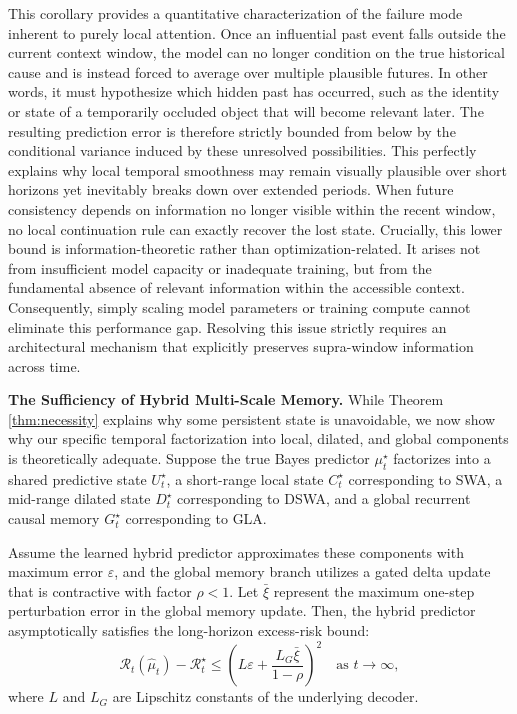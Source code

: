 \documentclass{llmxive}
\begin{document}
\begin{remark}
\normalfont This corollary provides a quantitative characterization of the failure mode inherent to purely local attention. Once an influential past event falls outside the current context window, the model can no longer condition on the true historical cause and is instead forced to average over multiple plausible futures. In other words, it must hypothesize which hidden past has occurred, such as the identity or state of a temporarily occluded object that will become relevant later. The resulting prediction error is therefore strictly bounded from below by the conditional variance induced by these unresolved possibilities. This perfectly explains why local temporal smoothness may remain visually plausible over short horizons yet inevitably breaks down over extended periods. When future consistency depends on information no longer visible within the recent window, no local continuation rule can exactly recover the lost state. Crucially, this lower bound is information-theoretic rather than optimization-related. It arises not from insufficient model capacity or inadequate training, but from the fundamental absence of relevant information within the accessible context. Consequently, simply scaling model parameters or training compute cannot eliminate this performance gap. Resolving this issue strictly requires an architectural mechanism that explicitly preserves supra-window information across time.
\end{remark}

\textbf{The Sufficiency of Hybrid Multi-Scale Memory.}
While Theorem \ref{thm:necessity} explains why some persistent state is unavoidable, we now show why our specific temporal factorization into local, dilated, and global components is theoretically adequate. Suppose the true Bayes predictor $\mu_t^\star$ factorizes into a shared predictive state $U_t^\star$, a short-range local state $C_t^\star$ corresponding to SWA, a mid-range dilated state $D_t^\star$ corresponding to DSWA, and a global recurrent causal memory $G_t^\star$ corresponding to GLA.

\begin{theorem}
\label{thm:sufficiency}
Assume the learned hybrid predictor approximates these components with maximum error $\varepsilon$, and the global memory branch utilizes a gated delta update that is contractive with factor $\rho < 1$. Let $\bar{\xi}$ represent the maximum one-step perturbation error in the global memory update. Then, the hybrid predictor asymptotically satisfies the long-horizon excess-risk bound:
\begin{equation}
\mathcal{R}_t(\hat{\mu}_t) - \mathcal{R}_t^\star \le \left( L\varepsilon + \frac{L_G \bar{\xi}}{1-\rho} \right)^2 \quad \text{as } t \to \infty,
\end{equation}
where $L$ and $L_G$ are Lipschitz constants of the underlying decoder.
\end{theorem}
\end{document}

